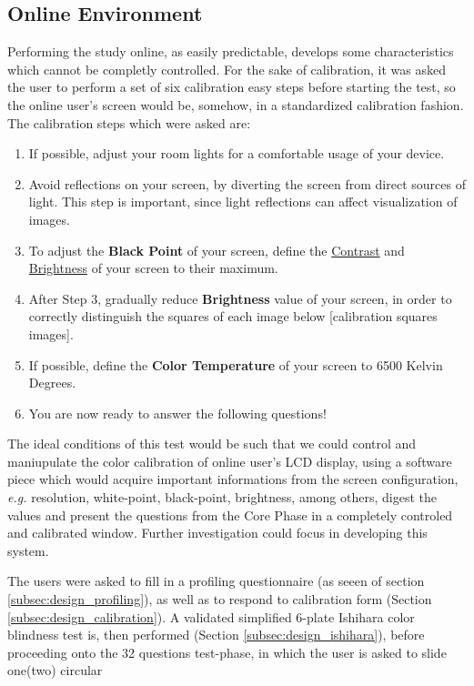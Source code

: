 \subsection{Online Environment}
%
Performing the study online, as easily predictable, develops some characteristics which cannot be completly controlled. For the sake of calibration, it was asked the user
to perform a set of six calibration easy steps before starting the test, so the online user's screen would be,
somehow, in a standardized calibration fashion. The calibration steps which were asked are:
%
\begin{enumerate}
  \item If possible, adjust your room lights for a comfortable usage of your device.
  \item Avoid reflections on your screen, by diverting the screen from direct sources of light. This step is important,
  since light reflections can affect visualization of images.
  \item To adjust the \textbf{Black Point} of your screen, define the \ul{Contrast} and \ul{Brightness} of your screen to their maximum.
  \item After Step 3, gradually reduce \textbf{Brightness} value of your screen, in order to correctly distinguish the squares of each image below [calibration squares images].
  \item If possible, define the \textbf{Color Temperature} of your screen to 6500 Kelvin Degrees.
  \item You are now ready to answer the following questions!
\end{enumerate} \par
%
The ideal conditions of this test would be such that we could control and maniupulate the color calibration of online user's LCD display, using a software
piece which would acquire important informations from the screen configuration, \emph{e.g.} resolution, white-point, black-point, brightness, among others,
digest the values and present the questions from the Core Phase in a completely controled and calibrated window. Further investigation could focus in
developing this system. \par
%
The users were asked to fill in a profiling questionnaire (as seeen of section \ref{subsec:design_profiling}), as well as to respond to calibration form
(Section \ref{subsec:design_calibration}). A validated simplified 6-plate Ishihara color blindness test \cite{Alwis1992} is, then performed
(Section \ref{subsec:design_ishihara}), before proceeding onto the 32 questions test-phase, in which the user is asked to slide one(two) circular
